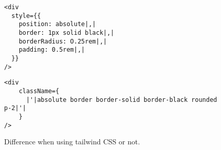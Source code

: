 \begin{figure}[t!]
	\begin{minipage}[b]{0.5\textwidth}
 		\centering
  		\begin{verbatim}
<div
  style={{
    position: absolute|,|
    border: 1px solid black|,|
    borderRadius: O.25rem|,|
    padding: 0.5rem|,|
  }}
/>
		\end{verbatim}
		\label{lst:no-tailwind}
	\end{minipage}
 	\begin{minipage}[b]{0.5\textwidth}
  		\centering
		\begin{verbatim}
<div
    className={
      |'|absolute border border-solid border-black rounded p-2|'|
    }
/>
		\end{verbatim}
		\label{lst:tailwind}
 	\end{minipage}
	\caption{Difference when using tailwind CSS or not.}
	\label{fig:examplecode-tailwindcss}
\end{figure}

